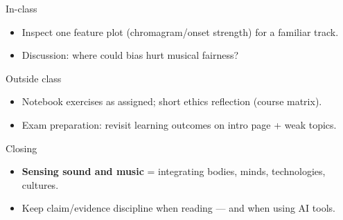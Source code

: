 \documentclass[aspectratio=169]{beamer}
\begin{document}
\begin{frame}{In-class}
  \begin{itemize}
    \item Inspect one feature plot (chromagram/onset strength) for a familiar track.
    \item Discussion: where could bias hurt musical fairness?
  \end{itemize}
\end{frame}

\begin{frame}{Outside class}
  \begin{itemize}
    \item Notebook exercises as assigned; short ethics reflection (course matrix).
    \item Exam preparation: revisit learning outcomes on intro page + weak topics.
  \end{itemize}
\end{frame}

\begin{frame}{Closing}
  \begin{itemize}
    \item \textbf{Sensing sound and music} = integrating bodies, minds, technologies, cultures.
    \item Keep claim/evidence discipline when reading — and when using AI tools.
  \end{itemize}
\end{frame}
\end{document}

